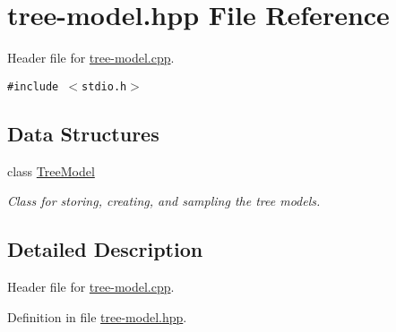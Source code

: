\hypertarget{tree-model_8hpp}{
\section{tree-model.hpp File Reference}
\label{tree-model_8hpp}
}
Header file for \hyperlink{tree-model_8cpp}{tree-model.cpp}. 

{\tt \#include $<$stdio.h$>$}\par
\subsection*{Data Structures}
\begin{CompactItemize}
\item 
class \hyperlink{class_tree_model}{Tree\-Model}
\begin{CompactList}\small\item\em Class for storing, creating, and sampling the tree models. \item\end{CompactList}\end{CompactItemize}


\subsection{Detailed Description}
Header file for \hyperlink{tree-model_8cpp}{tree-model.cpp}. 



Definition in file \hyperlink{tree-model_8hpp-source}{tree-model.hpp}.